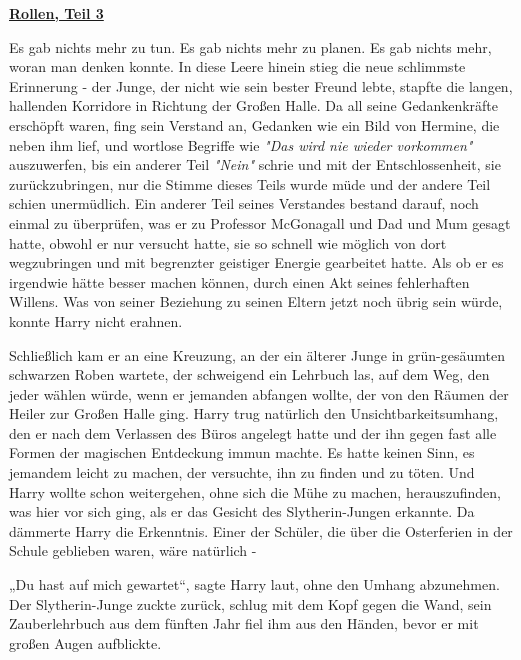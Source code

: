 

\hypertarget{rollen-teil-3}{%

\textbf{\uline{Rollen, Teil 3}}

\hfill\break Es gab nichts mehr zu tun. Es gab nichts mehr zu planen. Es gab nichts mehr, woran man denken konnte. In diese Leere hinein stieg die neue schlimmste Erinnerung - der Junge, der nicht wie sein bester Freund lebte, stapfte die langen, hallenden Korridore in Richtung der Großen Halle. Da all seine Gedankenkräfte erschöpft waren, fing sein Verstand an, Gedanken wie ein Bild von Hermine, die neben ihm lief, und wortlose Begriffe wie \emph{"Das wird nie wieder vorkommen"} auszuwerfen, bis ein anderer Teil \emph{"Nein"} schrie und mit der Entschlossenheit, sie zurückzubringen, nur die Stimme dieses Teils wurde müde und der andere Teil schien unermüdlich. Ein anderer Teil seines Verstandes bestand darauf, noch einmal zu überprüfen, was er zu Professor McGonagall und Dad und Mum gesagt hatte, obwohl er nur versucht hatte, sie so schnell wie möglich von dort wegzubringen und mit begrenzter geistiger Energie gearbeitet hatte. Als ob er es irgendwie hätte besser machen können, durch einen Akt seines fehlerhaften Willens. Was von seiner Beziehung zu seinen Eltern jetzt noch übrig sein würde, konnte Harry nicht erahnen.

Schließlich kam er an eine Kreuzung, an der ein älterer Junge in grün-gesäumten schwarzen Roben wartete, der schweigend ein Lehrbuch las, auf dem Weg, den jeder wählen würde, wenn er jemanden abfangen wollte, der von den Räumen der Heiler zur Großen Halle ging. Harry trug natürlich den Unsichtbarkeitsumhang, den er nach dem Verlassen des Büros angelegt hatte und der ihn gegen fast alle Formen der magischen Entdeckung immun machte. Es hatte keinen Sinn, es jemandem leicht zu machen, der versuchte, ihn zu finden und zu töten. Und Harry wollte schon weitergehen, ohne sich die Mühe zu machen, herauszufinden, was hier vor sich ging, als er das Gesicht des Slytherin-Jungen erkannte. Da dämmerte Harry die Erkenntnis. Einer der Schüler, die über die Osterferien in der Schule geblieben waren, wäre natürlich -

„Du hast auf mich gewartet“, sagte Harry laut, ohne den Umhang abzunehmen. Der Slytherin-Junge zuckte zurück, schlug mit dem Kopf gegen die Wand, sein Zauberlehrbuch aus dem fünften Jahr fiel ihm aus den Händen, bevor er mit großen Augen aufblickte.

}
